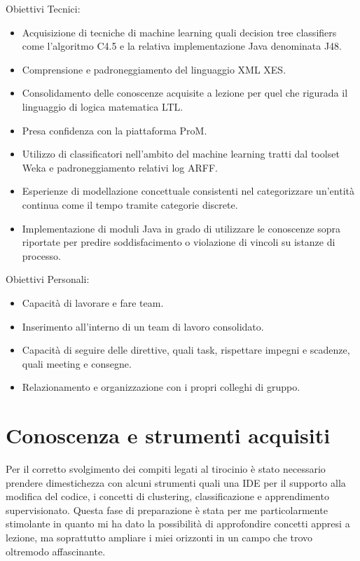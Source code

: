 \documentclass[11pt]{article} %
\begin{document}
Obiettivi Tecnici:
\begin{itemize}
	\item Acquisizione di tecniche di machine learning quali decision tree classifiers come l'algoritmo C4.5 e la relativa implementazione Java denominata J48.
	\item Comprensione e padroneggiamento del linguaggio XML XES.
	\item Consolidamento delle conoscenze acquisite a lezione per quel che rigurada il linguaggio di logica matematica LTL.
	\item Presa confidenza con la piattaforma ProM.
	\item Utilizzo di classificatori nell'ambito del machine learning tratti dal toolset Weka e padroneggiamento relativi log ARFF.
	\item Esperienze di modellazione concettuale consistenti nel categorizzare un'entità continua come il tempo tramite categorie discrete.
	\item Implementazione di moduli Java in grado di utilizzare le conoscenze sopra riportate per predire soddisfacimento o violazione di vincoli su istanze di processo.
\end{itemize}

Obiettivi Personali:
\begin{itemize}
	\item Capacità di lavorare e fare team.
	\item Inserimento all'interno di un team di lavoro consolidato.
	\item Capacità di seguire delle direttive, quali task, rispettare impegni e scadenze, quali meeting e consegne.
	\item Relazionamento e organizzazione con i propri colleghi di gruppo.
\end{itemize}

\section{Conoscenza e strumenti acquisiti}
Per il corretto svolgimento dei compiti legati al tirocinio è stato necessario prendere dimestichezza con alcuni strumenti quali una IDE per il supporto alla modifica del codice, i concetti di clustering, classificazione e apprendimento supervisionato. Questa fase di preparazione è stata per me particolarmente stimolante in quanto mi ha dato la possibilità di approfondire concetti appresi a lezione, ma soprattutto ampliare i miei orizzonti in un campo che trovo oltremodo affascinante.
\end{document}
